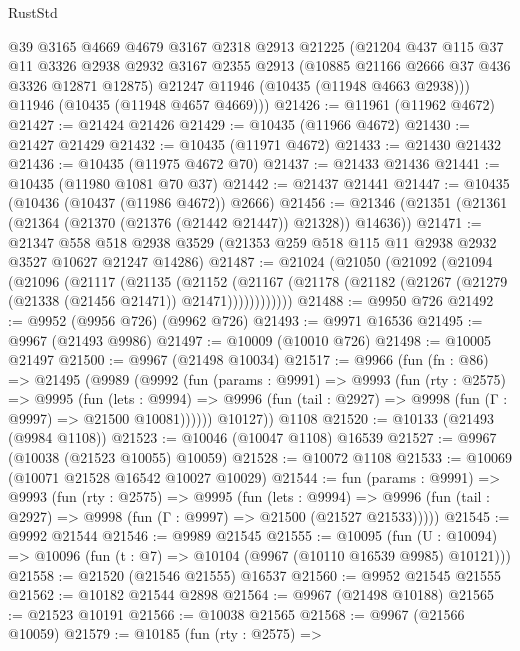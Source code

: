 \begin{lexlean}{RustStd}
\begin{coremodule}
{\begin{coremodule}
{{{{{{{{{{{{{{{{{{{{{{{{{{{{{{{{{{{{{{{{{{{{{{{{{{{{{{{{{{{{{{{{{{{{{{{{{{{{{{      @39
      @3165
      @4669
      @4679
      @3167
      @2318
      @2913
      @21225
      (@21204
        @437
        @115
        @37
        @11
        @3326
        @2938
        @2932
        @3167
        @2355
        @2913
        (@10885 @21166 @2666 @37 @436 @3326 @12871 @12875)
        @21247
        @11946
        (@10435 (@11948 @4663 @2938)))
      @11946
      (@10435 (@11948 @4657 @4669)))
@21426 := @11961 (@11962 @4672)
@21427 := @21424 @21426
@21429 := @10435 (@11966 @4672)
@21430 := @21427 @21429
@21432 := @10435 (@11971 @4672)
@21433 := @21430 @21432
@21436 := @10435 (@11975 @4672 @70)
@21437 := @21433 @21436
@21441 := @10435 (@11980 @1081 @70 @37)
@21442 := @21437 @21441
@21447 := @10435 (@10436 (@10437 (@11986 @4672)) @2666)
@21456 := @21346 (@21351 (@21361 (@21364 (@21370 (@21376 (@21442 @21447)) @21328)) @14636))
@21471 := @21347
    @558
    @518
    @2938
    @3529
    (@21353 @259 @518 @115 @11 @2938 @2932 @3527 @10627 @21247 @14286)
@21487 := @21024
    (@21050
      (@21092
        (@21094
          (@21096
            (@21117
              (@21135
                (@21152
                  (@21167
                    (@21178 (@21182 (@21267 (@21279 (@21338 (@21456 @21471)) @21471))))))))))))
@21488 := @9950 @726
@21492 := @9952 (@9956 @726) (@9962 @726)
@21493 := @9971 @16536
@21495 := @9967 (@21493 @9986)
@21497 := @10009 (@10010 @726)
@21498 := @10005 @21497
@21500 := @9967 (@21498 @10034)
@21517 := @9966
    (fun (fn : @86) =>
    @21495
      (@9989
        (@9992
          (fun (params : @9991) =>
          @9993
            (fun (rty : @2575) =>
            @9995
              (fun (lets : @9994) =>
              @9996 (fun (tail : @2927) => @9998 (fun (Γ : @9997) => @21500 @10081))))))
        @10127))
    @1108
@21520 := @10133 (@21493 (@9984 @1108))
@21523 := @10046 (@10047 @1108) @16539
@21527 := @9967 (@10038 (@21523 @10055) @10059)
@21528 := @10072 @1108
@21533 := @10069 (@10071 @21528 @16542 @10027 @10029)
@21544 := fun (params : @9991) =>
  @9993
    (fun (rty : @2575) =>
    @9995
      (fun (lets : @9994) =>
      @9996 (fun (tail : @2927) => @9998 (fun (Γ : @9997) => @21500 (@21527 @21533)))))
@21545 := @9992 @21544
@21546 := @9989 @21545
@21555 := @10095
    (fun (U : @10094) => @10096 (fun (t : @7) => @10104 (@9967 (@10110 @16539 @9985) @10121)))
@21558 := @21520 (@21546 @21555) @16537
@21560 := @9952 @21545 @21555
@21562 := @10182 @21544 @2898
@21564 := @9967 (@21498 @10188)
@21565 := @21523 @10191
@21566 := @10038 @21565
@21568 := @9967 (@21566 @10059)
@21579 := @10185
    (fun (rty : @2575) =>
}}}}}}}}}}}}}}}}}}}}}}}}}}}}}}}}}}}}}}}}}}}}}}}}}}}}}}}}}}}}}}}}}}}}}}}}}}}}}}
\end{coremodule}}
\end{coremodule}
\end{lexlean}
